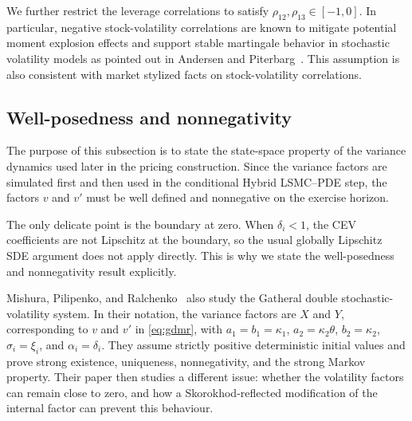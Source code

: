 \documentclass[pdflatex,sn-mathphys-num]{sn-jnl}
\theoremstyle{thmstyleone}%
\theoremstyle{thmstylethree}%
\newtheorem{assumption}[theorem]{Assumption}
\theoremstyle{thmstyletwo}%
\newcommand{\Q}{\mathbb Q}
\begin{document}
We further restrict the leverage correlations to satisfy 
$
\rho_{12},
\rho_{13} \in [-1,0].
$
In particular, negative stock-volatility correlations are known to mitigate potential moment explosion effects and support stable martingale behavior in stochastic volatility models as pointed out in Andersen and Piterbarg~\cite{AndersenPiterbarg2007}. This assumption is also consistent with market stylized facts on stock-volatility correlations.




\subsection{Well-posedness and nonnegativity}\label{sec:wellposed}



The purpose of this subsection is to state the state-space property of the variance dynamics used later in the pricing construction. Since the variance factors are simulated first and then used in the conditional Hybrid LSMC--PDE step, the factors $v$ and $v'$ must be well defined and nonnegative on the exercise horizon.

The only delicate point is the boundary at zero. When $\delta_i<1$, the CEV coefficients are not Lipschitz at the boundary, so the usual globally Lipschitz SDE argument does not apply directly. This is why we state the well-posedness and nonnegativity result explicitly.

Mishura, Pilipenko, and Ralchenko~\cite{mishura2025gatheral} also study the Gatheral double stochastic-volatility system. In their notation, the variance factors are $X$ and $Y$, corresponding to $v$ and $v'$ in \eqref{eq:gdmr}, with $a_1=b_1=\kappa_1$, $a_2=\kappa_2\theta$, $b_2=\kappa_2$, $\sigma_i=\xi_i$, and $\alpha_i=\delta_i$. They assume strictly positive deterministic initial values and prove strong existence, uniqueness, nonnegativity, and the strong Markov property. Their paper then studies a different issue: whether the volatility factors can remain close to zero, and how a Skorokhod-reflected modification of the internal factor can prevent this behaviour.
\end{document}
